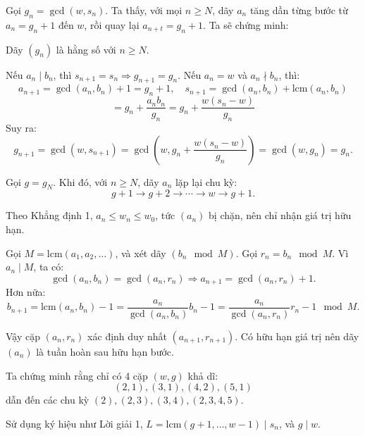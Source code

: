 \begin{problem}
\begin{soln}
    Gọi \( g_n = \gcd(w, s_n) \). Ta thấy, với mọi \( n \ge N \), dãy \( a_n \) tăng dần từng bước từ \( a_n = g_n + 1 \) đến \( w \), rồi quay lại \( a_{n+t} = g_n + 1 \). Ta sẽ chứng minh:

    \begin{claim*}
        Dãy \( (g_n) \) là hằng số với \( n \ge N \).
    \end{claim*}

    \begin{subproof}
        Nếu \( a_n \mid b_n \), thì \( s_{n+1} = s_n \Rightarrow g_{n+1} = g_n \). Nếu \( a_n = w \) và \( a_n \nmid b_n \), thì:
        \[
            a_{n+1} = \gcd(a_n, b_n) + 1 = g_n + 1, \quad s_{n+1} = \gcd(a_n, b_n) + \text{lcm}(a_n, b_n)
        \]
        \[
            = g_n + \frac{a_n b_n}{g_n} = g_n + \frac{w(s_n - w)}{g_n}
        \]
        Suy ra:
        \[
            g_{n+1} = \gcd(w, s_{n+1}) = \gcd\left(w, g_n + \frac{w(s_n - w)}{g_n}\right) = \gcd(w, g_n) = g_n.
        \]
    \end{subproof}

    Gọi \( g = g_N \). Khi đó, với \( n \ge N \), dãy \( a_n \) lặp lại chu kỳ:
    \[
        g + 1 \to g + 2 \to \cdots \to w \to g + 1.
    \]
\end{soln}

\begin{soln}
    Theo Khẳng định 1, \( a_n \le w_n \le w_0 \), tức \( (a_n) \) bị chặn, nên chỉ nhận giá trị hữu hạn.

    Gọi \( M = \text{lcm}(a_1, a_2, \ldots) \), và xét dãy \( (b_n \mod M) \). Gọi \( r_n = b_n \mod M \). Vì \( a_n \mid M \), ta có:
    \[
        \gcd(a_n, b_n) = \gcd(a_n, r_n) \Rightarrow a_{n+1} = \gcd(a_n, r_n) + 1.
    \]
    Hơn nữa:
    \[
        b_{n+1} = \text{lcm}(a_n, b_n) - 1 = \frac{a_n}{\gcd(a_n, b_n)} b_n - 1 = \frac{a_n}{\gcd(a_n, r_n)} r_n - 1 \mod M.
    \]

    Vậy cặp \( (a_n, r_n) \) xác định duy nhất \( (a_{n+1}, r_{n+1}) \). Có hữu hạn giá trị nên dãy \( (a_n) \) là tuần hoàn sau hữu hạn bước.
\end{soln}

\begin{remark*}
    Ta chứng minh rằng chỉ có 4 cặp \( (w, g) \) khả dĩ:
    \[
        (2, 1), (3, 1), (4, 2), (5, 1)
    \]
    dẫn đến các chu kỳ \( (2), (2, 3), (3, 4), (2, 3, 4, 5) \).

    Sử dụng ký hiệu như Lời giải 1, \( L = \text{lcm}(g + 1, \ldots, w - 1) \mid s_n \), và \( g \mid w \).


\end{remark*}
\end{problem}
